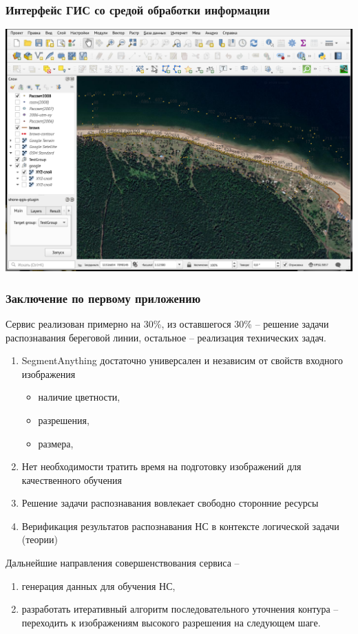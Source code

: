 \documentclass[10pt]{beamer}
\begin{document}
\begin{frame}
  \frametitle{Интерфейс ГИС со средой обработки информации}
  \includegraphics[width=1\linewidth]{screen-qgis.png}
\end{frame}

\begin{frame}
  \frametitle{Заключение по первому приложению}
  Сервис реализован примерно на 30\%, из оставшегося 30\% -- решение задачи распознавания береговой линии, остальное -- реализация технических задач.
  \begin{enumerate}
  \item SegmentAnything достаточно универсален и независим от свойств входного изображения
    \begin{itemize}
    \item наличие цветности,
    \item разрешения,
    \item размера,
    \end{itemize}
  \item Нет необходимости тратить время на подготовку изображений для качественного обучения
  \item Решение задачи распознавания вовлекает свободно сторонние ресурсы
  \item Верификация результатов распознавания НС в контексте логической задачи (теории)
  \end{enumerate}
  Дальнейшие направления совершенствования сервиса --
  \begin{enumerate}
  \item генерация данных для обучения НС,
  \item разработать итеративный алгоритм последовательного уточнения контура -- переходить к изображениям высокого разрешения на следующем шаге.
  \end{enumerate}
\end{frame}
\end{document}
